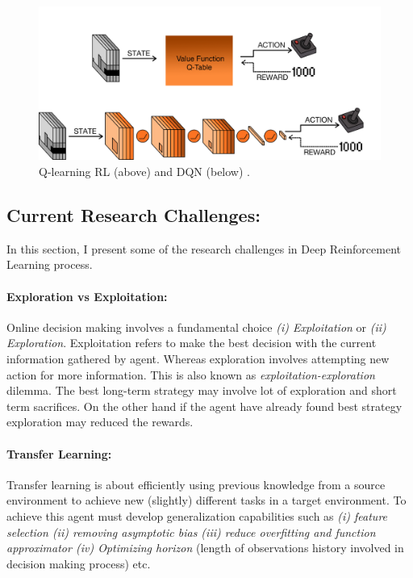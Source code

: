 \begin{figure}[t]
	\includegraphics[width=0.95\linewidth ]{fig/dqn.png}
    \vspace{-2mm}
    \caption{Q-learning RL (above) and DQN (below) \cite{mnih2015human}.}
    \label{fig:dqn}
\end{figure}

\subsection*{Current Research Challenges:}
In this section, I present some of the research challenges in Deep Reinforcement Learning process.
\paragraph{Exploration vs Exploitation:}
Online decision making involves a fundamental choice {\em (i) Exploitation} or {\em (ii) Exploration}. Exploitation refers to make the best decision with the current information gathered by agent. Whereas exploration involves attempting new action for more information. This is also known as {\em exploitation-exploration} dilemma. The best long-term strategy may involve lot of exploration and short term sacrifices. On the other hand if the agent have already found best strategy exploration may reduced the rewards.

\paragraph{Transfer Learning:}
Transfer learning is about efficiently using previous knowledge from a
source environment to achieve new (slightly) different tasks in a target environment. To achieve this agent must develop generalization capabilities such as {\em (i) feature selection (ii) removing asymptotic bias (iii) reduce overfitting and function approximator (iv) Optimizing horizon} (length of observations history involved in decision making process) etc.


